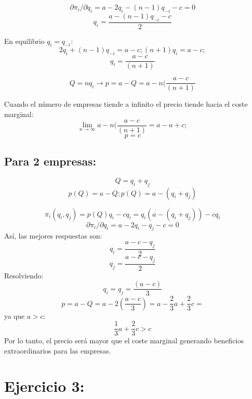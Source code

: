\documentclass{article}
\theoremstyle{definition}
\theoremstyle{remark}
\begin{document}
$$\partial \pi_i/\partial q_i= a-2q_i-(n-1)q_{-i}-c=0$$
$$q_i=\frac{a-(n-1)q_{-i}-c}{2}$$

En equilibrio $q_i=q_{-i}$:
$$2q_i+(n-1)q_{-i}=a-c; (n+1)q_i=a-c;$$
$$q_i=\frac{a-c}{(n+1)}$$

$$Q=nq_i \rightarrow p=a-Q=a-n(\frac{a-c}{(n+1)}$$

Cuando el n\'umero de empresas tiende a infinito el precio tiende hacia el coste marginal:
$$\lim_{n\rightarrow \infty}a-n(\frac{a-c}{(n+1)}=a-a+c;$$
$$p=c$$

\subsection{Para 2 empresas:}

$$Q=q_i+q_j$$
$$p(Q)=a-Q; p(Q)=a-(q_i+q_j)$$

$$\pi_i(q_i,q_j)=p(Q)q_i-cq_i=q_i(a-(q_i+q_j))-cq_i$$
$$\partial \pi_i/\partial q_i= a-2q_i-q_j-c=0$$
As\'i, las mejores respuestas son:
$$q_i=\frac{a-c-q_j}{2}$$
$$q_j=\frac{a-c-q_j}{2}$$
Resolviendo:
$$q_i=q_j=\frac{(a-c)}{3}$$
$$p=a-Q=a-2(\frac{a-c}{3})=a-\frac{2}{3}a+\frac{2}{3}c=$$
ya que $a>c$:
$$\frac{1}{3}a+\frac{2}{3}c>c$$
Por lo tanto, el precio ser\'a mayor que el coste marginal generando beneficios extraordinarios para las empresas.

\section{Ejercicio 3:}
\end{document}
